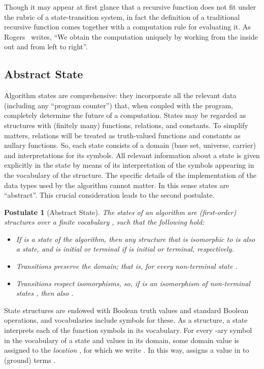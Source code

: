 \documentclass[copyright,creativecommons,english]{eptcs}
\newtheorem{postulate}{Postulate}
\begin{document}
Though it may appear at first glance that a recursive function does not fit under the rubric of a state-transition system,
in fact the definition of a traditional recursive function comes together with
a computation rule for evaluating it.
As Rogers~\cite[p.~7]{Rogers} writes,
``We obtain the computation uniquely by working from the inside out and
from left to right''.

\subsection{Abstract State}

Algorithm states are comprehensive:
they incorporate all the relevant data (including any ``program counter'')
that, when coupled with the program, completely determine the future of a computation.
States may be regarded as structures with (finitely many) functions, relations, and constants.
To simplify matters, relations will be treated as truth-valued functions
and constants as nullary functions.
So, each state consists of a domain (base set, universe, carrier) and interpretations for its symbols.
All relevant information about a state
is given explicitly in the state by means of its interpretation of the symbols
appearing in the vocabulary of the structure.
The specific details of the implementation of the data types used by the algorithm cannot matter.
In this sense states are ``abstract''. This crucial consideration leads to the second postulate.

\begin{postulate}[Abstract State]\label{P2}
The states  of an algorithm are (first-order) structures
over a finite vocabulary , such that the following hold:
\begin{itemize}
\item If  is a state of the algorithm, then any structure  that is isomorphic to  is also a state, and  is initial or terminal if  is initial or terminal, respectively.
\item Transitions preserve the domain; that is,  for every non-terminal state .
\item Transitions respect isomorphisms, so, if  is an isomorphism of non-terminal states , then also .
\end{itemize}
\end{postulate}

State structures are endowed with
Boolean truth values and standard Boolean operations, and vocabularies include symbols for these.
As a structure, a state interprets each of the function symbols in its vocabulary.
For every -ary symbol
 in the vocabulary of a state  and values
  in its domain,
some domain value 
is assigned to the \emph{location} , for which
we write  .
In this way,  assigns a value  in  to (ground) terms .
\end{document}
